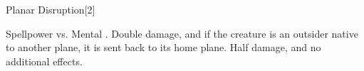 \begin{spellsection}{Planar Disruption}[2]
    \begin{spellheader}
    \end{spellheader}
    \begin{spellcontent}
        \begin{spelltargetinginfo}
        \end{spelltargetinginfo}
        \begin{spelleffects}
            \begin{spellattack}{Spellpower vs. Mental}
                \spellsuccess {}.
                \spellcritical Double damage, and if the creature is an outsider native to another plane, it is sent back to its home plane.
                \spellfailure Half damage, and no additional effects.
            \end{spellattack}
        \end{spelleffects}
    \end{spellcontent}
    \begin{spellfooter}
        \miscastrandom
    \end{spellfooter}
    \begin{spellaugments}
    \end{spellaugments}
\end{spellsection}

